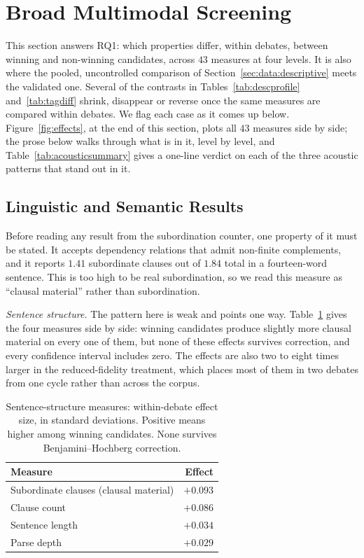 \documentclass[pdflatex,sn-mathphys-num]{sn-jnl}%
\begin{document}
\section{Broad Multimodal Screening}
\label{sec:method:screen}

This section answers RQ1: which properties differ, within debates, between
winning and non-winning candidates, across $43$ measures at four levels. It
is also where the pooled, uncontrolled comparison of
Section~\ref{sec:data:descriptive} meets the validated one. Several of the
contrasts in Tables~\ref{tab:descprofile} and~\ref{tab:tagdiff} shrink,
disappear or reverse once the same measures are compared within debates. We
flag each case as it comes up below. Figure~\ref{fig:effects}, at the end of
this section, plots all $43$ measures side by side; the prose below walks
through what is in it, level by level, and Table~\ref{tab:acousticsummary}
gives a one-line verdict on each of the three acoustic patterns that stand
out in it.

\subsection{Linguistic and Semantic Results}
\label{sec:method:linguistic}

Before reading any result from the subordination counter, one property of it
must be stated. It accepts dependency relations that admit non-finite
complements, and it reports $1.41$ subordinate clauses out of $1.84$ total
in a fourteen-word sentence. This is too high to be real subordination, so
we read this measure as ``clausal material'' rather than subordination.

\emph{Sentence structure.} The pattern here is weak and points one way.
Table~\ref{tab:sentstruct} gives the four measures side by side: winning
candidates produce slightly more clausal material on every one of them, but
none of these effects survives correction, and every confidence interval
includes zero. The effects are also two to eight times larger in the
reduced-fidelity treatment, which places most of them in two debates from
one cycle rather than across the corpus.

\begin{table}[t]
\caption{Sentence-structure measures: within-debate effect size, in
standard deviations. Positive means higher among winning candidates. None
survives Benjamini--Hochberg correction.}
\label{tab:sentstruct}
\centering
\begin{tabular}{lr}
\toprule
Measure & Effect \\
\midrule
Subordinate clauses (clausal material) & $+0.093$ \\
Clause count                           & $+0.086$ \\
Sentence length                        & $+0.034$ \\
Parse depth                            & $+0.029$ \\
\bottomrule
\end{tabular}
\end{table}
\end{document}
